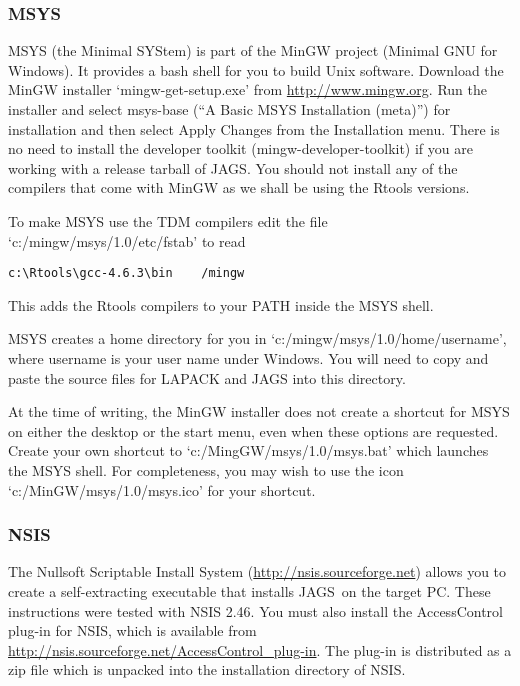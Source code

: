 \documentclass[11pt, a4paper, titlepage]{article}
\newcommand{\JAGS}{\textsf{JAGS}}
\newcommand{\code}[1]{{\bgroup{\normalfont\ttfamily #1}\egroup}}
\newcommand{\file}[1]{{`\normalfont\textsf{#1}'}}
\begin{document}
\subsubsection{MSYS}

MSYS (the Minimal SYStem) is part of the MinGW project (Minimal GNU
for Windows). It provides a bash shell for you to build Unix
software. Download the MinGW installer \file{mingw-get-setup.exe} from
\url{http://www.mingw.org}.  Run the installer and select
\code{msys-base} (``A Basic MSYS Installation (meta)'') for
installation and then select \code{Apply Changes} from the
\code{Installation} menu. There is no need to install the developer
toolkit (\code{mingw-developer-toolkit}) if you are working with a
release tarball of \JAGS.  You should not install any of the compilers
that come with MinGW as we shall be using the Rtools versions.

To make MSYS use the TDM compilers edit the file
\file{c:/mingw/msys/1.0/etc/fstab} to read
\begin{verbatim}
c:\Rtools\gcc-4.6.3\bin    /mingw
\end{verbatim}
This adds the Rtools compilers to your PATH inside the MSYS shell.

MSYS creates a home directory for you in
\file{c:/mingw/msys/1.0/home/username}, where \code{username} is your
user name under Windows. You will need to copy and paste the source
files for LAPACK and JAGS into this directory.

At the time of writing, the MinGW installer does not create a shortcut
for MSYS on either the desktop or the start menu, even when these
options are requested. Create your own shortcut to
\file{c:/MingGW/msys/1.0/msys.bat} which launches the MSYS shell. For
completeness, you may wish to use the icon
\file{c:/MinGW/msys/1.0/msys.ico} for your shortcut.

\subsubsection{NSIS}

The Nullsoft Scriptable Install System
(\url{http://nsis.sourceforge.net}) allows you to create a
self-extracting executable that installs \JAGS\ on the target PC.
These instructions were tested with NSIS 2.46.  You must also install
the AccessControl plug-in for NSIS, which is available from
\url{http://nsis.sourceforge.net/AccessControl_plug-in}. The plug-in
is distributed as a zip file which is unpacked into the installation
directory of NSIS.
\end{document}
